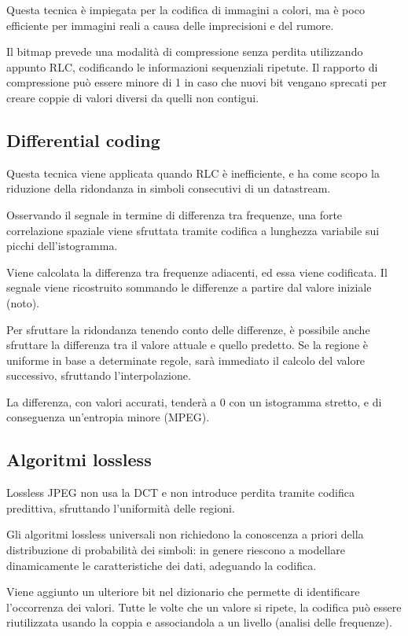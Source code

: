 Questa tecnica è impiegata per la codifica di immagini a colori, ma è poco efficiente per immagini reali a causa delle imprecisioni e del rumore. 

Il bitmap prevede una modalità di compressione senza perdita utilizzando appunto RLC, codificando le informazioni sequenziali ripetute. Il rapporto di compressione può essere minore di 1 in caso che nuovi bit vengano sprecati per creare coppie di valori diversi da quelli non contigui.

\subsection{Differential coding}
Questa tecnica viene applicata quando RLC è inefficiente, e ha come scopo la riduzione della ridondanza in simboli consecutivi di un datastream.

Osservando il segnale in termine di differenza tra frequenze, una forte correlazione spaziale viene sfruttata tramite codifica a lunghezza variabile sui picchi dell'istogramma. 

Viene calcolata la differenza tra frequenze adiacenti, ed essa viene codificata. Il segnale viene ricostruito sommando le differenze a partire dal valore iniziale (noto).

Per sfruttare la ridondanza tenendo conto delle differenze, è possibile anche sfruttare la differenza tra il valore attuale e quello predetto. Se la regione è uniforme in base a determinate regole, sarà immediato il calcolo del valore successivo, sfruttando l'interpolazione. 

La differenza, con valori accurati, tenderà a 0 con un istogramma stretto, e di conseguenza un'entropia minore (MPEG). 

\subsection{Algoritmi lossless}
Lossless JPEG non usa la DCT e non introduce perdita tramite codifica predittiva, sfruttando l'uniformità delle regioni.

Gli algoritmi lossless universali non richiedono la conoscenza a priori della distribuzione di probabilità dei simboli: in genere riescono a modellare dinamicamente le caratteristiche dei dati, adeguando la codifica.

Viene aggiunto un ulteriore bit nel dizionario che permette di identificare l'occorrenza dei valori. Tutte le volte che un valore si ripete, la codifica può essere riutilizzata usando la coppia e associandola a un livello (analisi delle frequenze). 

